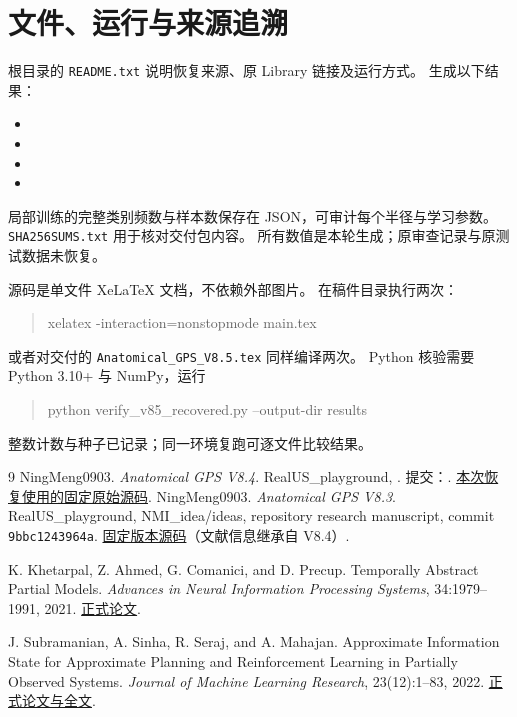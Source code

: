 \documentclass[11pt,a4paper,fontset=fandol]{ctexart}
\theoremstyle{definition}
\theoremstyle{remark}
\numberwithin{equation}{section}
\begin{document}
\section{文件、运行与来源追溯}
\label{app:reproduce}
根目录的 \texttt{README.txt} 说明恢复来源、原 Library 链接及运行方式。
 生成以下结果：
\begin{itemize}
\item {}
\item {}
\item {}
\item {}
\end{itemize}
局部训练的完整类别频数与样本数保存在 JSON，可审计每个半径与学习参数。
\texttt{SHA256SUMS.txt} 用于核对交付包内容。
所有数值是本轮生成；原审查记录与原测试数据未恢复。

源码是单文件 XeLaTeX 文档，不依赖外部图片。
在稿件目录执行两次：
\begin{quote}\small\ttfamily
xelatex -interaction=nonstopmode main.tex
\end{quote}
或者对交付的 \texttt{Anatomical\_GPS\_V8.5.tex} 同样编译两次。
Python 核验需要 Python 3.10+ 与 NumPy，运行
\begin{quote}\small\ttfamily
python verify\_v85\_recovered.py --output-dir results
\end{quote}
整数计数与种子已记录；同一环境复跑可逐文件比较结果。

\begin{thebibliography}{9}
NingMeng0903. \emph{Anatomical GPS V8.4}. RealUS\_playground,
.
提交：.
\href{https://github.com/NingMeng0903/RealUS_playground/blob/11ba97e9fe9ab4c6c144ccb50779072722bd9110/NMI_idea/ideas/Anatomical_GPS_V8.4.tex}{本次恢复使用的固定原始源码}.
NingMeng0903. \emph{Anatomical GPS V8.3}. RealUS\_playground, NMI\_idea/ideas, repository research manuscript, commit \texttt{9bbc1243964a}. \href{https://github.com/NingMeng0903/RealUS_playground/blob/9bbc1243964acff4fb47185fec1e148e748f42a2/NMI_idea/ideas/Anatomical_GPS_V8.3.tex}{固定版本源码}（文献信息继承自 V8.4）.


K. Khetarpal, Z. Ahmed, G. Comanici, and D. Precup.
Temporally Abstract Partial Models.
\emph{Advances in Neural Information Processing Systems}, 34:1979--1991, 2021.
\href{https://papers.nips.cc/paper/2021/file/0f3d014eead934bbdbacb62a01dc4831-Paper.pdf}{正式论文}.


J. Subramanian, A. Sinha, R. Seraj, and A. Mahajan.
Approximate Information State for Approximate Planning and Reinforcement Learning in Partially Observed Systems.
\emph{Journal of Machine Learning Research}, 23(12):1--83, 2022.
\href{https://jmlr.org/papers/v23/20-1165.html}{正式论文与全文}.


\end{thebibliography}
\end{document}
